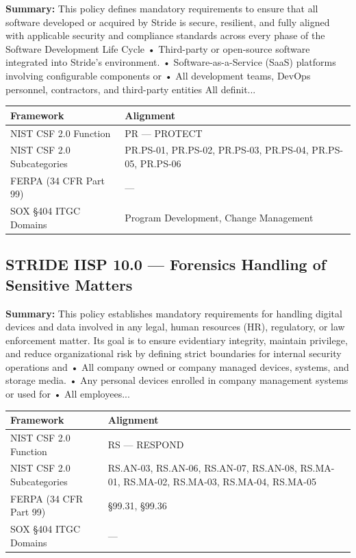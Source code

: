 \documentclass[11pt,landscape]{article}
\begin{document}
\textbf{Summary:} This policy defines mandatory requirements to ensure that all software developed or acquired by Stride is secure, resilient, and fully aligned with applicable security and compliance standards across every phase of the Software Development Life Cycle • Third-party or open-source software integrated into Stride's environment. • Software-as-a-Service (SaaS) platforms involving configurable components or • All development teams, DevOps personnel, contractors, and third-party entities All definit...

\begin{tabularx}{\textwidth}{|p{4cm}|X|}
\hline
\rowcolor{headgray} \textbf{Framework} & \textbf{Alignment} \\
\hline
NIST CSF 2.0 Function & PR --- PROTECT \\
\hline
NIST CSF 2.0 Subcategories & PR.PS-01, PR.PS-02, PR.PS-03, PR.PS-04, PR.PS-05, PR.PS-06 \\
\hline
FERPA (34 CFR Part 99) & --- \\
\hline
SOX §404 ITGC Domains & Program Development, Change Management \\
\hline
\end{tabularx}


\subsection{\textcolor{strideblue}{STRIDE IISP 10.0} --- Forensics Handling of Sensitive Matters}
\label{pol:IISP100}

\textbf{Summary:} This policy establishes mandatory requirements for handling digital devices and data involved in any legal, human resources (HR), regulatory, or law enforcement matter. Its goal is to ensure evidentiary integrity, maintain privilege, and reduce organizational risk by defining strict boundaries for internal security operations and • All company owned or company managed devices, systems, and storage media. • Any personal devices enrolled in company management systems or used for • All employees...

\begin{tabularx}{\textwidth}{|p{4cm}|X|}
\hline
\rowcolor{headgray} \textbf{Framework} & \textbf{Alignment} \\
\hline
NIST CSF 2.0 Function & RS --- RESPOND \\
\hline
NIST CSF 2.0 Subcategories & RS.AN-03, RS.AN-06, RS.AN-07, RS.AN-08, RS.MA-01, RS.MA-02, RS.MA-03, RS.MA-04, RS.MA-05 \\
\hline
FERPA (34 CFR Part 99) & §99.31, §99.36 \\
\hline
SOX §404 ITGC Domains & --- \\
\hline
\end{tabularx}
\end{document}
